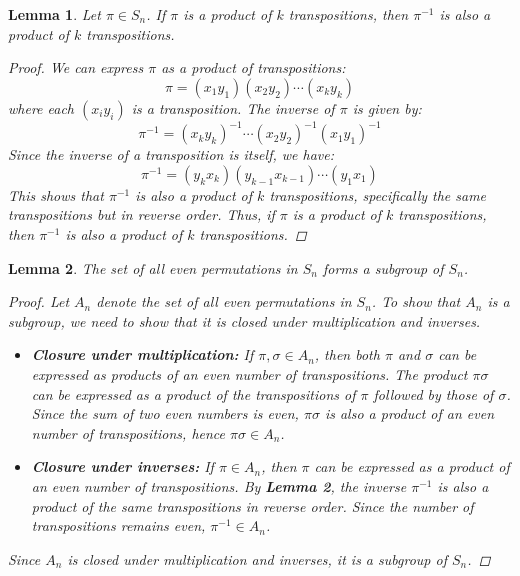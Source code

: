 \documentclass[12pt]{article}
\newtheorem{lemma}{Lemma}
\begin{document}
\begin{lemma}
  Let $\pi \in S_n$. If $\pi$ is a product of $k$ transpositions, then
  $\pi^{-1}$ is also a product of $k$ transpositions.
  \begin{proof}
    We can express $\pi$ as a product of transpositions:
    \[
      \pi = (x_1 y_1)(x_2 y_2) \cdots (x_k y_k)
    \]
    where each $(x_i y_i)$ is a transposition. The inverse of $\pi$ is given by:
    \[
      \pi^{-1} = (x_k y_k)^{-1} \cdots (x_2 y_2)^{-1} (x_1 y_1)^{-1}
    \]
    Since the inverse of a transposition is itself, we have:
    \[
      \pi^{-1} = (y_k x_k)(y_{k-1} x_{k-1}) \cdots (y_1 x_1)
    \]
    This shows that $\pi^{-1}$ is also a product of $k$ transpositions,
    specifically the same transpositions but in reverse order. Thus, if $\pi$ is a
    product of $k$ transpositions, then $\pi^{-1}$ is also a product of $k$ transpositions.
  \end{proof}
\end{lemma}


\begin{lemma}
  The set of all even permutations in $S_n$ forms a subgroup of $S_n$.
  \begin{proof}
    Let $A_n$ denote the set of all even permutations in $S_n$.
    To show that $A_n$ is a subgroup, we need to show that it is closed under multiplication and inverses.
    \begin{itemize}
      \item \textbf{Closure under multiplication:} If $\pi, \sigma \in A_n$,
            then both $\pi$ and $\sigma$ can be expressed as products of an even number of transpositions.
            The product $\pi \sigma$ can be expressed as a product of the transpositions of $\pi$ followed by those of $\sigma$.
            Since the sum of two even numbers is even, $\pi \sigma$ is also a product of an even number of transpositions, hence $\pi \sigma \in A_n$.
      \item \textbf{Closure under inverses:} If $\pi \in A_n$, then $\pi$ can be expressed as a product of an even number of transpositions.
            By \textbf{Lemma 2}, the inverse $\pi^{-1}$ is also a product of the same transpositions in reverse order.
            Since the number of transpositions remains even, $\pi^{-1} \in A_n$.
    \end{itemize}
    Since $A_n$ is closed under multiplication and inverses, it is a subgroup of $S_n$.
  \end{proof}
\end{lemma}


\end{document}
